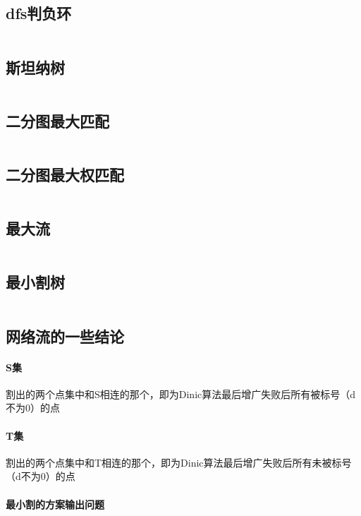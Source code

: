 \documentclass[a4paper,11pt]{article}
\begin{document}
    \subsection{dfs判负环}
    \inputminted[breaklines]{c++}{Graph/dfs判负环.cpp}

    \subsection{斯坦纳树}
    \inputminted[breaklines]{c++}{Graph/斯坦纳树.cpp}
    
    \subsection{二分图最大匹配}
    \inputminted[breaklines]{c++}{Graph/二分图最大匹配.cpp}

    \subsection{二分图最大权匹配}
    \inputminted[breaklines]{c++}{Graph/KM.cpp}

    \subsection{最大流}
    \inputminted[breaklines]{c++}{Graph/Dinic.cpp}

    \subsection{最小割树}
    \inputminted[breaklines]{c++}{Graph/最小割树.cpp}
    
    \subsection{网络流的一些结论}
    
    \paragraph{S集}割出的两个点集中和S相连的那个，即为Dinic算法最后增广失败后所有被标号（d不为0）的点
     \paragraph{T集}割出的两个点集中和T相连的那个，即为Dinic算法最后增广失败后所有未被标号（d不为0）的点
     \paragraph{最小割的方案输出问题}
     \ 
     
\end{document}
